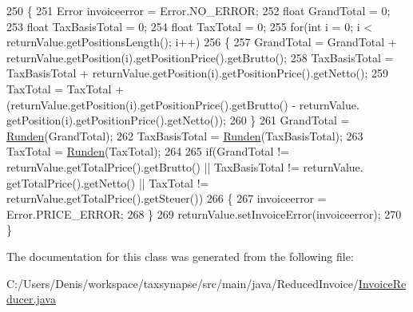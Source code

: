 \begin{DoxyCode}
250     \{
251         Error invoiceerror = Error.NO\_ERROR;
252         \textcolor{keywordtype}{float} GrandTotal = 0;
253         \textcolor{keywordtype}{float} TaxBasisTotal = 0;
254         \textcolor{keywordtype}{float} TaxTotal = 0;
255         \textcolor{keywordflow}{for}(\textcolor{keywordtype}{int} i = 0; i < returnValue.getPositionsLength(); i++)
256         \{
257             GrandTotal = GrandTotal + returnValue.getPosition(i).getPositionPrice().getBrutto();
258             TaxBasisTotal = TaxBasisTotal + returnValue.getPosition(i).getPositionPrice().getNetto();
259             TaxTotal = TaxTotal + (returnValue.getPosition(i).getPositionPrice().getBrutto() - returnValue.
      getPosition(i).getPositionPrice().getNetto());
260         \}
261         GrandTotal = \hyperlink{class_reduced_invoice_1_1_invoice_reducer_a4d9155f5cc7223ed2659a8567f9ba1ec}{Runden}(GrandTotal);
262         TaxBasisTotal = \hyperlink{class_reduced_invoice_1_1_invoice_reducer_a4d9155f5cc7223ed2659a8567f9ba1ec}{Runden}(TaxBasisTotal);
263         TaxTotal = \hyperlink{class_reduced_invoice_1_1_invoice_reducer_a4d9155f5cc7223ed2659a8567f9ba1ec}{Runden}(TaxTotal);
264         
265         \textcolor{keywordflow}{if}(GrandTotal != returnValue.getTotalPrice().getBrutto() || TaxBasisTotal != returnValue.
      getTotalPrice().getNetto() || TaxTotal != returnValue.getTotalPrice().getSteuer())
266         \{
267             invoiceerror = Error.PRICE\_ERROR;
268         \}
269         returnValue.setInvoiceError(invoiceerror);
270     \}
\end{DoxyCode}


The documentation for this class was generated from the following file\+:\begin{DoxyCompactItemize}
\item 
C\+:/\+Users/\+Denis/workspace/taxsynapse/src/main/java/\+Reduced\+Invoice/\hyperlink{_invoice_reducer_8java}{Invoice\+Reducer.\+java}\end{DoxyCompactItemize}

